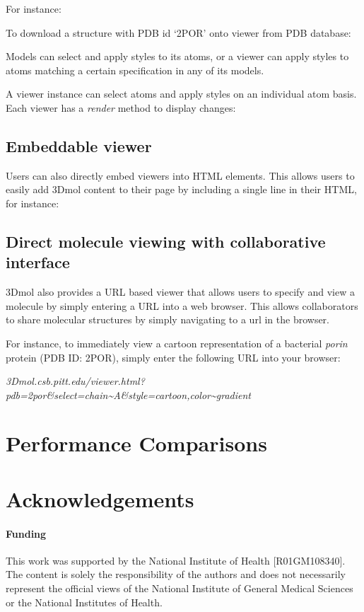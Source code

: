 \documentclass[]{bioinfo}
\begin{document}
For instance:

To download a structure with PDB id `2POR' onto viewer from PDB database:



Models can select and apply styles to its atoms, or a viewer can apply styles to atoms matching a certain specification in any of its models.

A viewer instance can select atoms and apply styles on an individual atom basis.  Each viewer has a \emph{render} method to display changes:



\subsection{Embeddable viewer}
Users can also directly embed viewers into HTML elements. This allows users to easily add 3Dmol content to their page by including a single line in their HTML, for instance:


\subsection{Direct molecule viewing with collaborative interface}
3Dmol also provides a URL based viewer that allows users to specify and view a molecule by simply entering a URL into a web browser.  This allows collaborators to share molecular structures by simply navigating to a url in the browser. 

For instance, to immediately view a cartoon representation of a bacterial \emph{porin} protein (PDB ID: 2POR), simply enter the following URL into your browser:

\emph{3Dmol.csb.pitt.edu/viewer.html?pdb=2por\&select=chain\~{}A\&style=cartoon,color\~{}gradient}

\section{Performance Comparisons}



\section*{Acknowledgements}

\paragraph{Funding\textcolon} 
This work was supported by the National Institute of Health [R01GM108340].
The content is solely the responsibility of the authors and does not necessarily
represent the official views of the National Institute of General Medical Sciences
or the National Institutes of Health.



\end{document}

